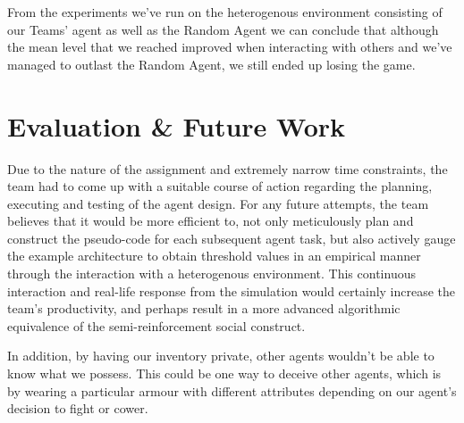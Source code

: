 From the experiments we've run on the heterogenous environment consisting of our Teams' agent as well as the Random Agent we can conclude that although the mean level that we reached improved when interacting with others and we've managed to outlast the Random Agent, we still ended up losing the game.

\section{Evaluation \& Future Work}

Due to the nature of the assignment and extremely narrow time constraints, the team had to come up with a suitable course of action regarding the planning, executing and testing of the agent design. For any future attempts, the team believes that it would be more efficient to, not only meticulously plan and construct the pseudo-code for each subsequent agent task, but also actively gauge the example architecture to obtain threshold values in an empirical manner through the interaction with a heterogenous environment. This continuous interaction and real-life response from the simulation would certainly increase the team's productivity, and perhaps result in a more advanced algorithmic equivalence of the semi-reinforcement social construct.

In addition, by having our inventory private, other agents wouldn't be able to know what we possess. This could be one way to deceive other agents, which is by wearing a particular armour with different attributes depending on our agent's decision to fight or cower. 
